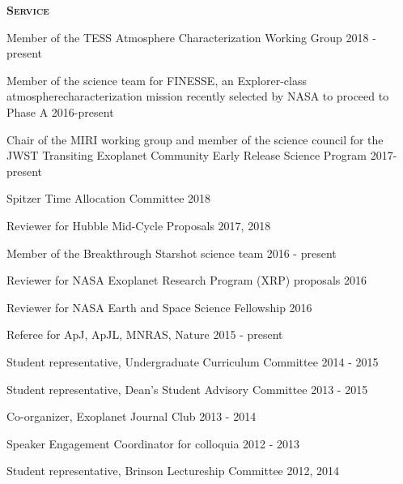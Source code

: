 \documentclass[12pt,letterpaper]{article}
\begin{document}
\vspace{5mm}


\vspace{3mm}
\textbf{\textsc{Service}} 
\begin{compactitem}[]
\item {Member of the TESS Atmosphere Characterization Working Group \hfill 2018 - present}	
\item {Member of the science team for FINESSE, an Explorer-class atmosphere\newline characterization mission recently selected by NASA to proceed to Phase A \hfill 2016-present}
\item {Chair of the MIRI working group and member of the science council for the \newline JWST Transiting Exoplanet Community Early Release Science Program \hfill 2017- present}
\item {Spitzer Time Allocation Committee \hfill 2018}
\item {Reviewer for Hubble Mid-Cycle Proposals \hfill 2017, 2018}
\item {Member of the Breakthrough Starshot science team \hfill 2016 - present}
\item Reviewer for NASA Exoplanet Research Program (XRP) proposals \hfill	2016
\item Reviewer for NASA Earth and Space Science Fellowship \hfill 2016
\item Referee for ApJ, ApJL, MNRAS, Nature \hfill 2015 - present
\item Student representative, Undergraduate Curriculum Committee \hfill 2014 - 2015
\item Student representative, Dean's Student Advisory Committee \hfill 2013 - 2015
\item Co-organizer, Exoplanet Journal Club \hfill 2013 - 2014
\item Speaker Engagement Coordinator for colloquia \hfill 2012 - 2013
\item Student representative, Brinson Lectureship Committee \hfill 2012, 2014
\end{compactitem}
\end{document}
